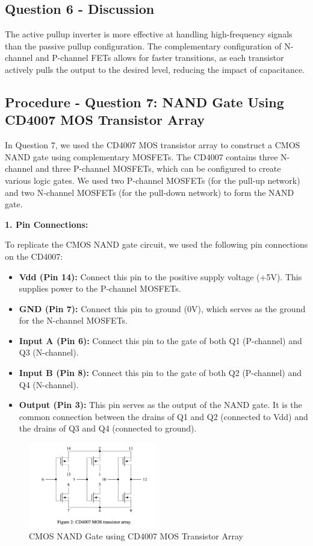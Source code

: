 \documentclass{article}
\begin{document}
    \subsection*{\textbf{Question 6 - Discussion}}
    The active pullup inverter is more effective at handling high-frequency signals than the passive pullup configuration. The complementary configuration of N-channel and P-channel FETs allows for faster transitions, as each transistor actively pulls the output to the desired level, reducing the impact of capacitance.

    \subsection*{\textbf{Procedure - Question 7: NAND Gate Using CD4007 MOS Transistor Array}}
    In Question 7, we used the CD4007 MOS transistor array to construct a CMOS NAND gate using complementary MOSFETs. The CD4007 contains three N-channel and three P-channel MOSFETs, which can be configured to create various logic gates. We used two P-channel MOSFETs (for the pull-up network) and two N-channel MOSFETs (for the pull-down network) to form the NAND gate.
    
    \textbf{1. Pin Connections:}
    
    To replicate the CMOS NAND gate circuit, we used the following pin connections on the CD4007:
    
    \begin{itemize}
        \item \textbf{Vdd (Pin 14):} Connect this pin to the positive supply voltage (+5V). This supplies power to the P-channel MOSFETs.
        \item \textbf{GND (Pin 7):} Connect this pin to ground (0V), which serves as the ground for the N-channel MOSFETs.
        \item \textbf{Input A (Pin 6):} Connect this pin to the gate of both Q1 (P-channel) and Q3 (N-channel).
        \item \textbf{Input B (Pin 8):} Connect this pin to the gate of both Q2 (P-channel) and Q4 (N-channel).
        \item \textbf{Output (Pin 3):} This pin serves as the output of the NAND gate. It is the common connection between the drains of Q1 and Q2 (connected to Vdd) and the drains of Q3 and Q4 (connected to ground).
    \end{itemize}
    
    \begin{figure}[H]
        \centering
        \includegraphics[width=0.5\textwidth]{./img/Lab 10/10_7_1.png}  %
        \caption{CMOS NAND Gate using CD4007 MOS Transistor Array}
        \label{fig:CMOS_NAND_Gate}
    \end{figure}
    
\end{document}

